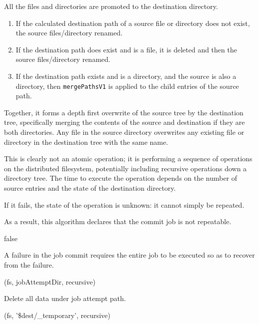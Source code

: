 \documentclass[conference]{IEEEtran}
\begin{document}
All the files and directories are promoted to the destination directory.

\begin{enumerate}
  \item If the calculated destination path of a source file or directory does
  not exist, the source files/directory renamed.
  \item If the destination path does exist and is a file, it is deleted and then
  the source files/directory renamed.
  \item If the destination path exists and is a directory, and the source
  is also a directory, then \texttt{mergePathsV1} is applied to the child
  entries of the source path.
\end{enumerate}

Together, it forms a depth first overwrite of the source tree by the destination
tree, specifically merging the contents of the source and destination if they
are both directories.
Any file in the source directory overwrites any existing file or directory
in the destination tree with the same name.


This is clearly not an atomic operation;
it is performing a sequence of operations on the distributed filesystem,
potentially including recursive operations down a directory tree.
The time to execute the operation depends on the number of source entries
and the state of the destination directory.

If it fails, the state of the operation is unknown: it cannot simply
be repeated.

As a result, this algorithm declares that the commit job is not repeatable.

\begin{function}
\caption{$isCommitJobRepeatable()$}
  false\;
\end{function}

A failure in the job commit requires
the entire job to be executed so as to recover from the failure.


\begin{procedure}
\caption{$abortJob()$}
  \delete(fs, jobAttemptDir, recursive)\;
\end{procedure}

Delete all data under job attempt path.

\begin{procedure}
\caption{$cleanupJob()$}
  \delete(fs, '\$dest/\_temporary', recursive)
\end{procedure}
\end{document}
